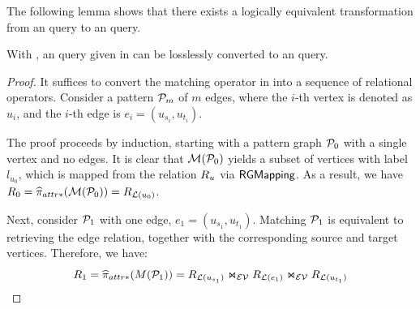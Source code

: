 The following lemma shows that there exists a logically equivalent transformation from an \spjm query to an \spj query.

\begin{lemma}
    \label{lem:spjm-to-spj}
    With \rgmapping, an \spjm query given in  can be losslessly converted to an \spj query.
\end{lemma}
\begin{proof}
    It suffices to convert the matching operator in  into a sequence of relational operators. Consider a pattern $\mathcal{P}_m$ of $m$ edges, where the $i$-th vertex is denoted as $u_i$, and the $i$-th edge is $e_i = (u_{s_i}, u_{t_i})$. %

The proof proceeds by induction, starting with a pattern graph $\mathcal{P}_0$ with a single vertex and no edges. It is clear that $\mathcal{M}(\mathcal{P}_0)$ yields a subset of vertices with label $l_{u_0}$, which is mapped from the relation ${R_{u}}$ via ${\mathsf{RGMapping}}$. As a result, we have $R_0 = \widehat{\pi}_{attr*}(\mathcal{M}(\mathcal{P}_0)) = {R_{\mathcal{L}(u_0)}}$.

Next, consider $\mathcal{P}_1$ with one edge, $e_1 = (u_{s_1}, u_{t_1})$. Matching $\mathcal{P}_1$ is equivalent to retrieving the edge relation, together with the corresponding source and target vertices. Therefore, we have:
\[ R_1 = \widehat{\pi}_{attr*}(M(\mathcal{P}_1)) = {R_{\mathcal{L}(u_{s_1})}} \Join_\mathcal{EV} {R_{\mathcal{L}(e_1)}} \Join_\mathcal{EV} {R_{\mathcal{L}(u_{t_1})}} \]


\end{proof}
